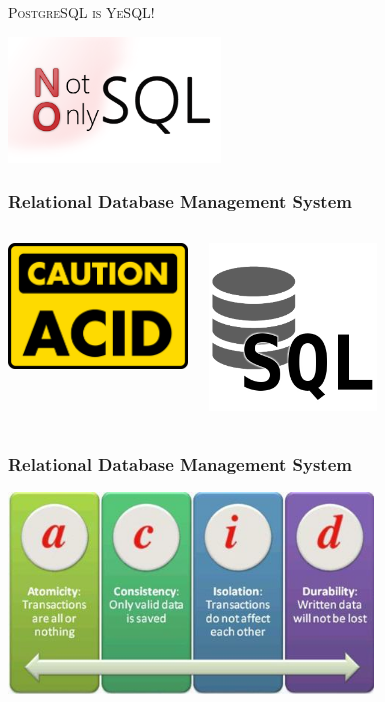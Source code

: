 \documentclass{beamer}
\begin{document}
\begin{frame}
  \begin{center}
    \textsc{\Huge PostgreSQL is YeSQL!}
    \vfill

    \includegraphics[height=9em]{nosql-bigdata.png}
  \end{center}
\end{frame}

\begin{frame}
  \frametitle{Relational Database Management System}

  \begin{columns}[c]
    \begin{center}
      \includegraphics[height=9em]{caution_acid.png}
    \end{center}

    \begin{center}
      \includegraphics[height=12em]{sql.png}
    \end{center}
  \end{columns}
\end{frame}

\begin{frame}
  \frametitle{Relational Database Management System}

  \begin{center}
    \includegraphics[height=2.1in]{acid-details.jpg}
  \end{center}
\end{frame}
\end{document}
